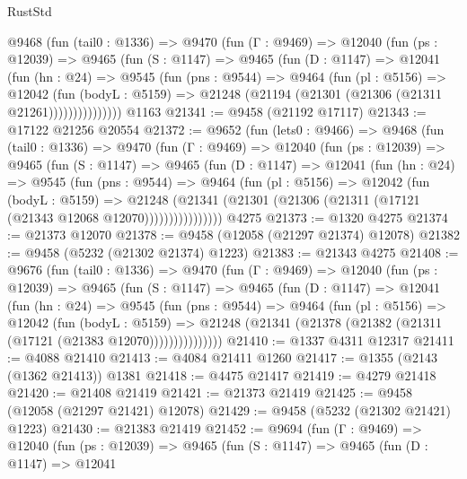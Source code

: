 \begin{lexlean}{RustStd}
\begin{coremodule}
      @9468
        (fun (tail0 : @1336) =>
        @9470
          (fun (Γ : @9469) =>
          @12040
            (fun (ps : @12039) =>
            @9465
              (fun (S : @1147) =>
              @9465
                (fun (D : @1147) =>
                @12041
                  (fun (hn : @24) =>
                  @9545
                    (fun (pns : @9544) =>
                    @9464
                      (fun (pl : @5156) =>
                      @12042
                        (fun (bodyL : @5159) =>
                        @21248 (@21194 (@21301 (@21306 (@21311 @21261)))))))))))))))
    @1163
@21341 := @9458 (@21192 @17117)
@21343 := @17122 @21256 @20554
@21372 := @9652
    (fun (lets0 : @9466) =>
    @9468
      (fun (tail0 : @1336) =>
      @9470
        (fun (Γ : @9469) =>
        @12040
          (fun (ps : @12039) =>
          @9465
            (fun (S : @1147) =>
            @9465
              (fun (D : @1147) =>
              @12041
                (fun (hn : @24) =>
                @9545
                  (fun (pns : @9544) =>
                  @9464
                    (fun (pl : @5156) =>
                    @12042
                      (fun (bodyL : @5159) =>
                      @21248
                        (@21341
                          (@21301 (@21306 (@21311 (@17121 (@21343 @12068 @12070))))))))))))))))
    @4275
@21373 := @1320 @4275
@21374 := @21373 @12070
@21378 := @9458 (@12058 (@21297 @21374) @12078)
@21382 := @9458 (@5232 (@21302 @21374) @1223)
@21383 := @21343 @4275
@21408 := @9676
    (fun (tail0 : @1336) =>
    @9470
      (fun (Γ : @9469) =>
      @12040
        (fun (ps : @12039) =>
        @9465
          (fun (S : @1147) =>
          @9465
            (fun (D : @1147) =>
            @12041
              (fun (hn : @24) =>
              @9545
                (fun (pns : @9544) =>
                @9464
                  (fun (pl : @5156) =>
                  @12042
                    (fun (bodyL : @5159) =>
                    @21248 (@21341 (@21378 (@21382 (@21311 (@17121 (@21383 @12070)))))))))))))))
@21410 := @1337 @4311 @12317
@21411 := @4088 @21410
@21413 := @4084 @21411 @1260
@21417 := @1355 (@2143 (@1362 @21413)) @1381
@21418 := @4475 @21417
@21419 := @4279 @21418
@21420 := @21408 @21419
@21421 := @21373 @21419
@21425 := @9458 (@12058 (@21297 @21421) @12078)
@21429 := @9458 (@5232 (@21302 @21421) @1223)
@21430 := @21383 @21419
@21452 := @9694
    (fun (Γ : @9469) =>
    @12040
      (fun (ps : @12039) =>
      @9465
        (fun (S : @1147) =>
        @9465
          (fun (D : @1147) =>
          @12041

\end{coremodule}
\end{lexlean}
